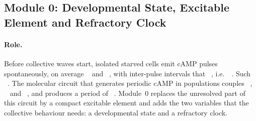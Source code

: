 \subsection{Module 0: Developmental State, Excitable Element and Refractory Clock}\label{sec:m0}

\paragraph{Role.}
Before collective waves start, isolated starved cells emit cAMP pulses spontaneously, on average ~\cite{ford2023} and ~\cite{ford2023}, with inter-pulse intervals that ~\cite{ford2023}, i.e.\ ~\cite{ford2023}.
Such ~\cite{gregor2010,sgro2015}.
The molecular circuit that generates periodic cAMP in populations couples ~\cite{laub1998,maeda2004}, ~\cite{laub1998,maeda2004} and ~\cite{laub1998,maeda2004}, and produces a period of ~\cite{laub1998,maeda2004}.
Module~0 replaces the unresolved part of this circuit by a compact excitable element and adds the two variables that the collective behaviour needs: a developmental state and a refractory clock.


